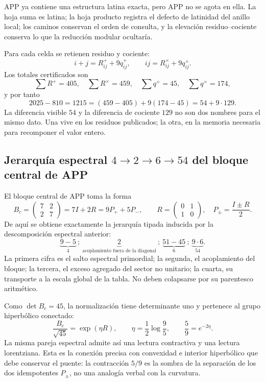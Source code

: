 \begin{resultbox}
APP ya contiene una estructura latina exacta, pero APP no se agota en ella.
La hoja suma es latina; la hoja producto registra el defecto de latinidad del
anillo local; los caminos conservan el orden de consulta, y la elevación
residuo--cociente conserva lo que la reducción modular ocultaría.
\end{resultbox}

Para cada celda se retienen residuo y cociente:
\[
 i+j=R^+_{ij}+9q^+_{ij},
 \qquad
 ij=R^\times_{ij}+9q^\times_{ij}.
 \tag{GMC-2.2}
\]
Los totales certificados son
\[
 \sum R^+=405,
 \quad \sum R^\times=459,
 \quad \sum q^+=45,
 \quad \sum q^\times=174,
\]
y por tanto
\[
 2025-810=1215=(459-405)+9(174-45)=54+9\cdot129.
 \tag{GMC-2.3}
\]
La diferencia visible $54$ y la diferencia de cociente $129$ no son dos
nombres para el mismo dato. Una vive en los residuos publicados; la otra, en
la memoria necesaria para recomponer el valor entero.

\subsection{Jerarquía espectral \(4\to2\to6\to54\) del bloque central de APP}

El bloque central de APP toma la forma
\[
 B_c=\begin{pmatrix}7&2\\2&7\end{pmatrix}
     =7I+2R
     =9P_++5P_-,
 \qquad
 R=\begin{pmatrix}0&1\\1&0\end{pmatrix},
 \quad P_\pm=\frac{I\pm R}{2}.
 \tag{GMC-2.4}
\]
De aquí se obtiene exactamente la jerarquía tipada inducida por la
descomposición espectral anterior:
\[
 \underbrace{9-5}_{4}
 \ ;\ 
 \underbrace{2}_{\text{acoplamiento fuera de la diagonal}}
 \ ;\ 
 \underbrace{51-45}_{6}
 \ ;\ 
 \underbrace{9\cdot6}_{54}.
 \tag{GMC-2.5}
\]
La primera cifra es el salto espectral primordial; la segunda, el acoplamiento
del bloque; la tercera, el exceso agregado del sector no unitario; la cuarta,
su transporte a la escala global de la tabla. No deben colapsarse por su
parentesco aritmético.

Como $\det B_c=45$, la normalización tiene determinante uno y pertenece al
grupo hiperbólico conectado:
\[
 \frac{B_c}{\sqrt{45}}
 =\exp(\eta R),
 \qquad
 \eta=\frac12\log\frac95,
 \qquad
 \frac59=e^{-2\eta}.
 \tag{GMC-2.6}
\]
La misma pareja espectral admite así una lectura contractiva y una lectura
lorentziana. Esta es la conexión precisa con convexidad e interior
hiperbólico que debe conservar el puente: la contracción $5/9$ es la sombra
de la separación de los dos idempotentes $P_\pm$, no una analogía verbal con
la curvatura.

